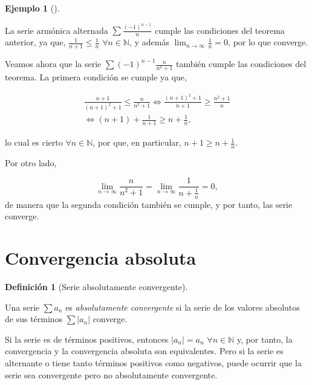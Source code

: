\documentclass[
  a4paper,
]{scrreport}
\theoremstyle{plain}
\theoremstyle{plain}
\theoremstyle{definition}
\newtheorem{definition}{Definición}[chapter]
\theoremstyle{definition}
\newtheorem{example}{Ejemplo}[chapter]
\theoremstyle{plain}
\theoremstyle{remark}
\begin{document}
\leavevmode{}%
\begin{example}[]\label{exm-criterio-serie-alternada}

La serie armónica alternada \(\sum \frac{(-1)^{n-1}}{n}\) cumple las
condiciones del teorema anterior, ya que,
\(\frac{1}{n+1}\leq \frac{1}{n}\) \(\forall n\in\mathbb{N}\), y además
\(\lim_{n\to\infty} \frac{1}{n}=0\), por lo que converge.

Veamos ahora que la serie \(\sum (-1)^{n-1}\frac{n}{n^2+1}\) también
cumple las condiciones del teorema. La primera condición se cumple ya
que,

\[
\begin{gathered}
\frac{n+1}{(n+1)^2+1}\leq\frac{n}{n^2+1} \Leftrightarrow \frac{(n+1)^2+1}{n+1}\geq\frac{n^2+1}{n}\\
\Leftrightarrow (n+1)+\frac{1}{n+1} \geq n+\frac{1}{n},
\end{gathered}
\]

lo cual es cierto \(\forall n\in\mathbb{N}\), por que, en particular,
\(n+1\geq n+\frac{1}{n}\).

Por otro lado,

\[
\lim_{n\to\infty}\frac{n}{n^2+1}= \lim_{n\to\infty}\frac{1}{n+\frac{1}{n}} = 0,
\] de manera que la segunda condición también se cumple, y por tanto,
las serie converge.

\end{example}

\hypertarget{convergencia-absoluta}{%
\section{Convergencia absoluta}\label{convergencia-absoluta}}

\leavevmode{}%
\begin{definition}[Serie absolutamente
convergente]\label{def-serie-absolutamente-convergente}

Una serie \(\sum a_n\) es \emph{absolutamente convergente} si la serie
de los valores absolutos de sus términos \(\sum |a_n|\) converge.

\end{definition}

Si la serie es de términos positivos, entonces \(|a_n|=a_n\)
\(\forall n\in\mathbb{N}\) y, por tanto, la convergencia y la
convergencia absoluta son equivalentes. Pero si la serie es alternante o
tiene tanto términos positivos como negativos, puede ocurrir que la
serie sea convergente pero no absolutamente convergente.
\end{document}
